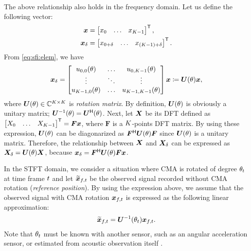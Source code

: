 \documentclass[sip,biber]{now-journal}
\begin{document}
The above relationship also holds in the frequency domain.
Let us define the following vector:
\begin{align}
  \bm{x} &= \begin{bmatrix} x _{0} & \dots & x _{K - 1} \end{bmatrix} ^{\mathsf{T}}, \\
  \bm{x} _{\delta} &= \begin{bmatrix} x _{0+\delta} & \dots & x _{(K - 1)+\delta} \end{bmatrix} ^{\mathsf{T}}.
\end{align}
From \eqref{eq:sfi:elem}, we have
\begin{equation}
  \bm{x} _{\delta}
  =
  \begin{bmatrix}
    u _{0, 0}(\theta) & \dots & u _{0, K - 1}(\theta) \\
    \vdots & \ddots & \vdots \\
    u _{K - 1, 0}(\theta) & \dots & u _{K - 1, K - 1}(\theta)
  \end{bmatrix}
  \bm{x}
  \coloneqq
  \bm{U} (\theta) \bm{x},
  \label{eq:rotmat}
\end{equation}
where $\bm{U} (\theta) \in \mathbb{C} ^{K\times K}$ is \emph{rotation matrix}.
By definition, $\bm{U} (\theta)$ is obviously a unitary matrix; $\bm{U} ^{-1} (\theta) = \bm{U} ^{\mathsf{H}} (\theta)$.
Next, let $\bm{X}$ be its DFT defined as $\begin{bmatrix} X _{0} & \dots & X _{K - 1}\end{bmatrix} ^{\mathsf{T}} = \bm{F} \bm{x}$, where $\bm{F}$ is a $K$-points DFT matrix.
By using these expression, $\bm{U} (\theta)$ can be diagonarized as $\bm{F}^{\mathsf{H}} \bm{U} (\theta) \bm{F}$ since $\bm{U} (\theta)$ is a unitary matrix.
Therefore, the relationship between $\bm{X}$ and $\bm{X} _{\delta}$ can be expressed as $\bm{X} _{\delta} = \bm{U} (\theta) \bm{X}$,
because $\bm{x} _{\delta} = \bm{F}^{\mathsf{H}} \bm{U} (\theta) \bm{F} \bm{x}$.

In the STFT domain, we consider a situation where CMA is rotated of degree $\theta _{t}$ at time frame $t$ and let $\refpos{\Obs} _{\ft}$ be the observed signal recorded without CMA rotation (\emph{reference position}).
By using the expression above, we assume that the observed signal with CMA rotation $\Obs _{\ft}$ is expressed as the following linear approximation:
\begin{equation}
  \refpos{\Obs} _{\ft} = \rotMat ^{-1} (\rotSpat _{\tframe}) \Obs _{\ft}.
\end{equation}
Note that $\theta _{t}$ must be known with another sensor, such as an angular acceleration sensor, or estimated from acoustic observation itself \cite{Lian:2021:APSIPA}.
\end{document}
